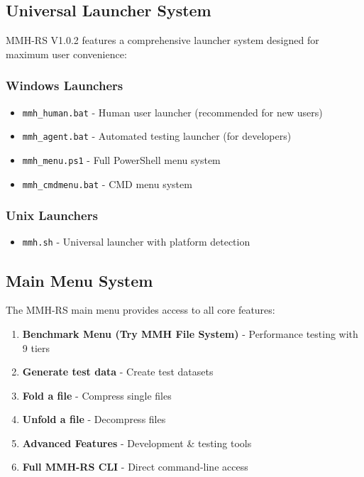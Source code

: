 \documentclass[11pt,a4paper]{article}
\begin{document}
	\subsection{Universal Launcher System}

	MMH-RS V1.0.2 features a comprehensive launcher system designed for maximum user convenience:

	\subsubsection{Windows Launchers}
	\begin{itemize}
		\item \texttt{mmh\_human.bat} - Human user launcher (recommended for new users)
		\item \texttt{mmh\_agent.bat} - Automated testing launcher (for developers)
		\item \texttt{mmh\_menu.ps1} - Full PowerShell menu system
		\item \texttt{mmh\_cmdmenu.bat} - CMD menu system
	\end{itemize}

	\subsubsection{Unix Launchers}
	\begin{itemize}
		\item \texttt{mmh.sh} - Universal launcher with platform detection
	\end{itemize}

	\subsection{Main Menu System}

	The MMH-RS main menu provides access to all core features:

	\begin{enumerate}
		\item \textbf{Benchmark Menu (Try MMH File System)} - Performance testing with 9 tiers
		\item \textbf{Generate test data} - Create test datasets
		\item \textbf{Fold a file} - Compress single files
		\item \textbf{Unfold a file} - Decompress files
		\item \textbf{Advanced Features} - Development \& testing tools
		\item \textbf{Full MMH-RS CLI} - Direct command-line access
	\end{enumerate}
\end{document}
